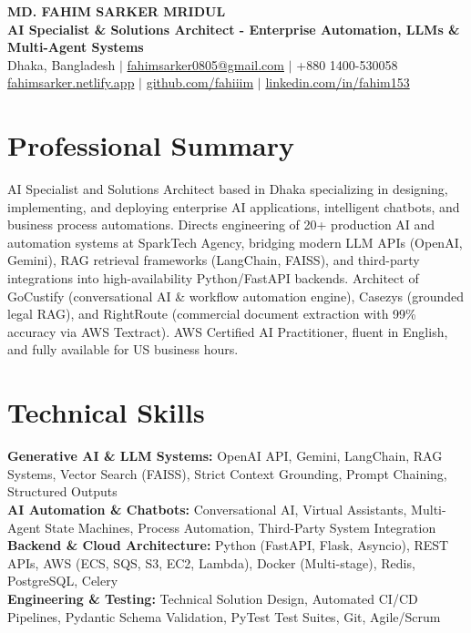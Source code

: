 \documentclass[9.5pt,a4paper]{article}
\begin{document}
{\centering
    {\Large \textbf{MD. FAHIM SARKER MRIDUL}}\\[1pt]
    \textbf{AI Specialist \& Solutions Architect - Enterprise Automation, LLMs \& Multi-Agent Systems}\\[1pt]
    Dhaka, Bangladesh \;$\vert$\; \href{mailto:fahimsarker0805@gmail.com}{fahimsarker0805@gmail.com} \;$\vert$\; +880 1400-530058\\[1pt]
    \href{https://fahimsarker.netlify.app}{fahimsarker.netlify.app} \;$\vert$\; \href{https://github.com/fahiiim}{github.com/fahiiim} \;$\vert$\; \href{https://linkedin.com/in/fahim153}{linkedin.com/in/fahim153}\par
}

\vspace{-4.5pt}
\section*{Professional Summary}
AI Specialist and Solutions Architect based in Dhaka specializing in designing, implementing, and deploying enterprise AI applications, intelligent chatbots, and business process automations. Directs engineering of 20+ production AI and automation systems at SparkTech Agency, bridging modern LLM APIs (OpenAI, Gemini), RAG retrieval frameworks (LangChain, FAISS), and third-party integrations into high-availability Python/FastAPI backends. Architect of GoCustify (conversational AI \& workflow automation engine), Casezys (grounded legal RAG), and RightRoute (commercial document extraction with 99\% accuracy via AWS Textract). AWS Certified AI Practitioner, fluent in English, and fully available for US business hours.

\section*{Technical Skills}
\noindent
\textbf{Generative AI \& LLM Systems:} OpenAI API, Gemini, LangChain, RAG Systems, Vector Search (FAISS), Strict Context Grounding, Prompt Chaining, Structured Outputs\\
\textbf{AI Automation \& Chatbots:} Conversational AI, Virtual Assistants, Multi-Agent State Machines, Process Automation, Third-Party System Integration\\
\textbf{Backend \& Cloud Architecture:} Python (FastAPI, Flask, Asyncio), REST APIs, AWS (ECS, SQS, S3, EC2, Lambda), Docker (Multi-stage), Redis, PostgreSQL, Celery\\
\textbf{Engineering \& Testing:} Technical Solution Design, Automated CI/CD Pipelines, Pydantic Schema Validation, PyTest Test Suites, Git, Agile/Scrum
\end{document}
